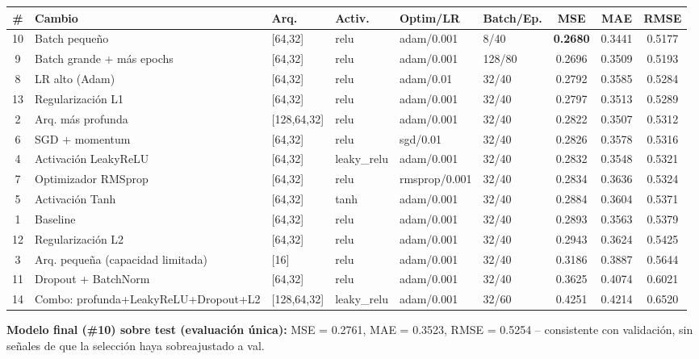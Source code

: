 \documentclass[9pt]{extarticle}
\begin{document}
\begin{center}
\begin{tabular}{@{}clllllccc@{}}
\toprule
\textbf{\#} & \textbf{Cambio} & \textbf{Arq.} & \textbf{Activ.} & \textbf{Optim/LR} & \textbf{Batch/Ep.} & \textbf{MSE} & \textbf{MAE} & \textbf{RMSE} \\
\midrule
10 & Batch pequeño & [64,32] & relu & adam/0.001 & 8/40 & \textbf{0.2680} & 0.3441 & 0.5177 \\
9  & Batch grande + más epochs & [64,32] & relu & adam/0.001 & 128/80 & 0.2696 & 0.3509 & 0.5193 \\
8  & LR alto (Adam) & [64,32] & relu & adam/0.01 & 32/40 & 0.2792 & 0.3585 & 0.5284 \\
13 & Regularización L1 & [64,32] & relu & adam/0.001 & 32/40 & 0.2797 & 0.3513 & 0.5289 \\
2  & Arq. más profunda & [128,64,32] & relu & adam/0.001 & 32/40 & 0.2822 & 0.3507 & 0.5312 \\
6  & SGD + momentum & [64,32] & relu & sgd/0.01 & 32/40 & 0.2826 & 0.3578 & 0.5316 \\
4  & Activación LeakyReLU & [64,32] & leaky\_relu & adam/0.001 & 32/40 & 0.2832 & 0.3548 & 0.5321 \\
7  & Optimizador RMSprop & [64,32] & relu & rmsprop/0.001 & 32/40 & 0.2834 & 0.3636 & 0.5324 \\
5  & Activación Tanh & [64,32] & tanh & adam/0.001 & 32/40 & 0.2884 & 0.3604 & 0.5371 \\
1  & Baseline & [64,32] & relu & adam/0.001 & 32/40 & 0.2893 & 0.3563 & 0.5379 \\
12 & Regularización L2 & [64,32] & relu & adam/0.001 & 32/40 & 0.2943 & 0.3624 & 0.5425 \\
3  & Arq. pequeña (capacidad limitada) & [16] & relu & adam/0.001 & 32/40 & 0.3186 & 0.3887 & 0.5644 \\
11 & Dropout + BatchNorm & [64,32] & relu & adam/0.001 & 32/40 & 0.3625 & 0.4074 & 0.6021 \\
14 & Combo: profunda+LeakyReLU+Dropout+L2 & [128,64,32] & leaky\_relu & adam/0.001 & 32/60 & 0.4251 & 0.4214 & 0.6520 \\
\bottomrule
\end{tabular}
\end{center}
\vspace{2pt}
\textbf{Modelo final (\#10) sobre test (evaluación única):} MSE = 0.2761, MAE = 0.3523, RMSE = 0.5254 -- consistente con validación, sin señales de que la selección haya sobreajustado a val.
\end{document}
